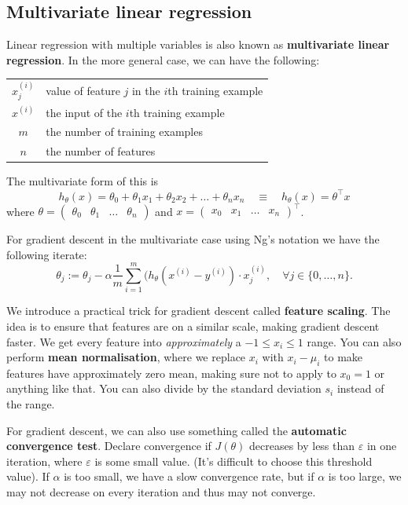\documentclass[a4paper, 12pt, oneside]{scrartcl}
\begin{document}
\subsection{Multivariate linear regression}

Linear regression with multiple variables is also known as \textbf{multivariate linear regression}. In the more general case, we can have the following:

\begin{center}
    \begin{tabular}{cl}
     $x_j^{(i)}$ & value of feature $j$ in the $i$th training example \\
     $x^{(i)}$ & the input of the $i$th training example \\
     $m$ & the number of training examples \\
     $n$ & the number of features
    \end{tabular}
\end{center}
The multivariate form of this is
\[h_\theta(x) = \theta_0 + \theta_1 x_1 + \theta_2 x_2 + \ldots + \theta_n x_n \quad \equiv \quad h_\theta(x) = \theta^\top x\]
where $\theta = \begin{pmatrix} \theta_0 & \theta_1 & \ldots & \theta_n \end{pmatrix}$ and $x = \begin{pmatrix} x_0 & x_1 & \ldots & x_n \end{pmatrix}^\top$.

For gradient descent in the multivariate case using Ng's notation we have the following iterate:
\[\theta_j := \theta_j - \alpha \frac1m \sum_{i=1}^m (h_\theta(x^{(i)} - y^{(i)}) \cdot x_j^{(i)}, \quad \forall j \in \{0, \ldots, n\}.\]

We introduce a practical trick for gradient descent called \textbf{feature scaling}. The idea is to ensure that features are on a similar scale, making gradient descent faster. We get every feature into \textit{approximately} a $-1 \leq x_i \leq 1$ range. You can also perform \textbf{mean normalisation}, where we replace $x_i$ with $x_i - \mu_i$ to make features have approximately zero mean, making sure not to apply to $x_0 = 1$ or anything like that. You can also divide by the standard deviation $s_i$ instead of the range.

For gradient descent, we can also use something called the \textbf{automatic convergence test}. Declare convergence if $J(\theta)$ decreases by less than $\varepsilon$ in one iteration, where $\varepsilon$ is some small value. (It's difficult to choose this threshold value). If $\alpha$ is too small, we have a slow convergence rate, but if $\alpha$ is too large, we may not decrease on every iteration and thus may not converge.
\end{document}
